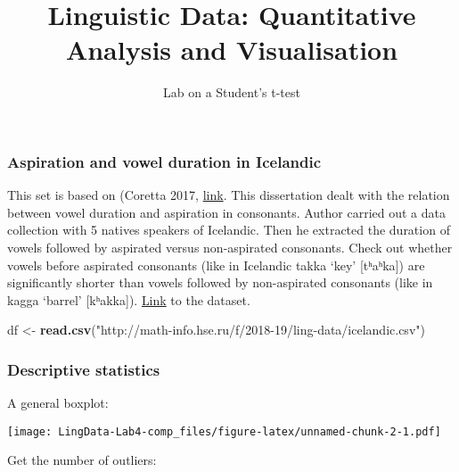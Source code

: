 \documentclass[]{article}
\title{Linguistic Data: Quantitative Analysis and Visualisation}
\subtitle{Lab on a Student's t-test}
\author{}
\date{}
\newenvironment{Shaded}{\begin{snugshade}}{\end{snugshade}}
\newcommand{\KeywordTok}[1]{\textcolor[rgb]{0.13,0.29,0.53}{\textbf{#1}}}
\newcommand{\StringTok}[1]{\textcolor[rgb]{0.31,0.60,0.02}{#1}}
\newcommand{\OperatorTok}[1]{\textcolor[rgb]{0.81,0.36,0.00}{\textbf{#1}}}
\newcommand{\NormalTok}[1]{#1}
\begin{document}
\maketitle

\subsubsection{Aspiration and vowel duration in
Icelandic}\label{aspiration-and-vowel-duration-in-icelandic}

This set is based on (Coretta 2017, \href{https://goo.gl/NrfgJm}{link}.
This dissertation dealt with the relation between vowel duration and
aspiration in consonants. Author carried out a data collection with 5
natives speakers of Icelandic. Then he extracted the duration of vowels
followed by aspirated versus non-aspirated consonants. Check out whether
vowels before aspirated consonants (like in Icelandic takka `key'
{[}tʰaʰka{]}) are signiﬁcantly shorter than vowels followed by
non-aspirated consonants (like in kagga `barrel' {[}kʰakka{]}).
\href{http://math-info.hse.ru/f/2018-19/ling-data/icelandic.csv}{Link}
to the dataset.

\begin{Shaded}
\begin{Highlighting}[]
\NormalTok{df <-}\StringTok{ }\KeywordTok{read.csv}\NormalTok{(}\StringTok{"http://math-info.hse.ru/f/2018-19/ling-data/icelandic.csv"}\NormalTok{)}
\end{Highlighting}
\end{Shaded}

\subsubsection{Descriptive statistics}\label{descriptive-statistics}

A general boxplot:

\begin{Shaded}
\end{Shaded}

\texttt{[image: LingData-Lab4-comp\_files/figure-latex/unnamed-chunk-2-1.pdf]}

Get the number of outliers:

\begin{Shaded}
\end{Shaded}
\end{document}
